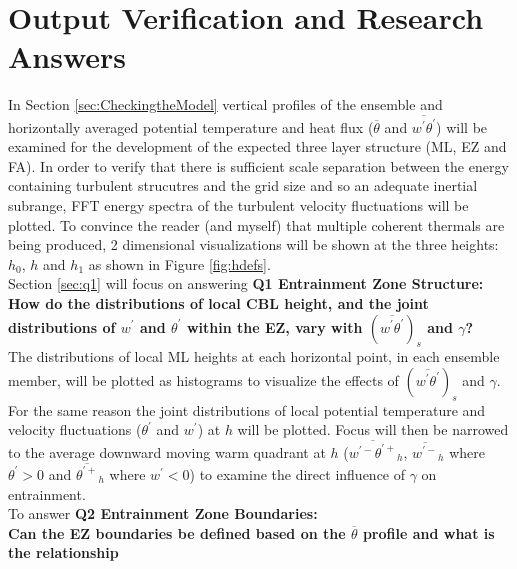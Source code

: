 
\chapter{Output Verification and Research Answers}
\label{ch:results}
\setlength{\parindent}{0cm}

In Section \ref{sec:CheckingtheModel} vertical profiles of the ensemble and horizontally averaged potential
temperature and heat flux ($\overline{\theta}$ and $\overline{w^{'}\theta^{'}}$) will be examined for the development
 of the expected three layer structure (\acs{ML}, \acs{EZ} and \acs{FA}).  In order to verify that there is sufficient
scale separation between the energy containing turbulent strucutres and the grid size and so an adequate inertial subrange, 
\acs{FFT} energy spectra of the turbulent velocity fluctuations will be plotted. To convince the reader (and myself) that multiple coherent thermals are being produced, 2 dimensional visualizations will be shown at the three heights: $h_{0}$, $h$ and $h_{1}$ as shown in Figure \ref{fig:hdefs}.\\

Section \ref{sec:q1} will focus on answering \textbf{Q1 Entrainment Zone Structure:} \\ 

\textbf{How do the distributions of local \acs{CBL} height, and the joint distributions of $w^{'}$ and $\theta^{'}$ within the \acs{EZ}, vary with $(\overline{w^{'}\theta^{'}})_{s}$ and $\gamma$?}\\

The distributions of local \acs{ML} heights at each horizontal point, in each ensemble member, will be plotted as histograms to visualize the effects of $(\overline{w^{'}\theta^{'}})_{s}$ and $\gamma$.  For the same reason the joint distributions of local potential temperature and velocity fluctuations ($\theta^{'}$ and $w^{'}$) at $h$ will be plotted.  Focus will then be narrowed to the average downward moving warm quadrant at $h$ ($\overline{w^{'-}\theta^{'+}}_{h}$, $\overline{w^{'-}}_{h}$  where $ \theta^{'} >0$ and $\overline{\theta^{'+}}_{h} $ where $ w^{'} < 0 $) to examine the direct influence of $\gamma$ on entrainment.\\       

To answer \textbf{Q2 Entrainment Zone Boundaries:}\\ 

\textbf{Can the \acs{EZ} boundaries be defined based on the $\overline{\theta}$ profile and what is the relationship} 

